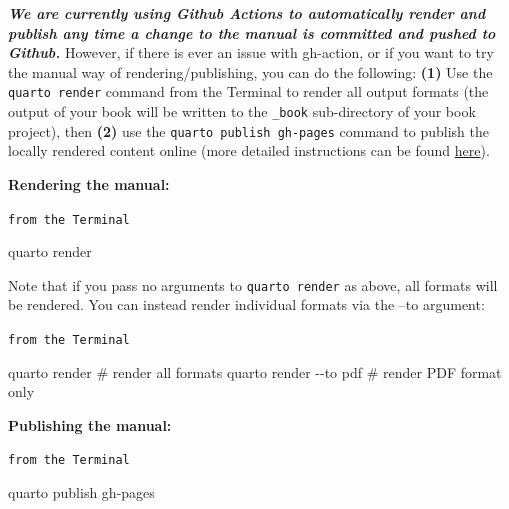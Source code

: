 \documentclass[
  letterpaper,
  oneside,
  open=any]{scrbook}
\newenvironment{Shaded}{\begin{snugshade}}{\end{snugshade}}
\newcommand{\CommentTok}[1]{\textcolor[rgb]{0.37,0.37,0.37}{#1}}
\newcommand{\NormalTok}[1]{\textcolor[rgb]{0.00,0.23,0.31}{#1}}
\newcommand{\SpecialCharTok}[1]{\textcolor[rgb]{0.37,0.37,0.37}{#1}}
\begin{document}
\textbf{\emph{We are currently using Github Actions to automatically
render and publish any time a change to the manual is committed and
pushed to Github.}} However, if there is ever an issue with gh-action,
or if you want to try the manual way of rendering/publishing, you can do
the following: \textbf{(1)} Use the \texttt{quarto\ render} command from
the Terminal to render all output formats (the output of your book will
be written to the \texttt{\_book} sub-directory of your book project),
then \textbf{(2)} use the \texttt{quarto\ publish\ gh-pages} command to
publish the locally rendered content online (more detailed instructions
can be found \href{https://quarto.org/docs/books/}{here}).

\textbf{Rendering the manual:}

\begin{codelisting}

\caption{\texttt{from the Terminal}}

\begin{Shaded}
\begin{Highlighting}[]
\NormalTok{quarto render}
\end{Highlighting}
\end{Shaded}

\end{codelisting}

Note that if you pass no arguments to \texttt{quarto\ render} as above,
all formats will be rendered. You can instead render individual formats
via the --to argument:

\begin{codelisting}

\caption{\texttt{from the Terminal}}

\begin{Shaded}
\begin{Highlighting}[]

\NormalTok{quarto render           }\CommentTok{\# render all formats}
\NormalTok{quarto render }\SpecialCharTok{{-}{-}}\NormalTok{to pdf  }\CommentTok{\# render PDF format only}
\end{Highlighting}
\end{Shaded}

\end{codelisting}

\textbf{Publishing the manual:}

\begin{codelisting}

\caption{\texttt{from the Terminal}}

\begin{Shaded}
\begin{Highlighting}[]
\NormalTok{quarto publish gh}\SpecialCharTok{{-}}\NormalTok{pages}
\end{Highlighting}
\end{Shaded}

\end{codelisting}
\end{document}
